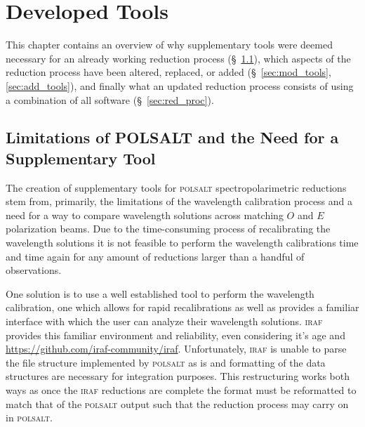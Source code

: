 \chapter{Developed Tools}

This chapter contains an overview of why supplementary tools were deemed necessary for an already working reduction process (\S~\ref{sec:polsalt_limits}), which aspects of the reduction process have been altered, replaced, or added (\S~\ref{sec:mod_tools}, \ref{sec:add_tools}), and finally what an updated reduction process consists of using a combination of all software (\S~\ref{sec:red_proc}).


\section{Limitations of POLSALT and the Need for a Supplementary Tool} \label{sec:polsalt_limits} %


The creation of supplementary tools for \textsc{polsalt} spectropolarimetric reductions stem from, primarily, the limitations of the wavelength calibration process and a need for a way to compare wavelength solutions across matching $O$ and $E$ polarization beams. Due to the time-consuming process of recalibrating the wavelength solutions it is not feasible to perform the wavelength calibrations time and time again for any amount of reductions larger than a handful of observations.
\prgph

One solution is to use a well established tool to perform the wavelength calibration, one which allows for rapid recalibrations as well as provides a familiar interface with which the user can analyze their wavelength solutions. \textsc{iraf} provides this familiar environment and reliability, even considering it's age and \hyperlink{limited community development}{https://github.com/iraf-community/iraf}. Unfortunately, \textsc{iraf} is unable to parse the file structure implemented by \textsc{polsalt} as is and formatting of the data structures are necessary for integration purposes. This restructuring works both ways as once the \textsc{iraf} reductions are complete the format must be reformatted to match that of the \textsc{polsalt} output such that the reduction process may carry on in \textsc{polsalt}.
\prgph

